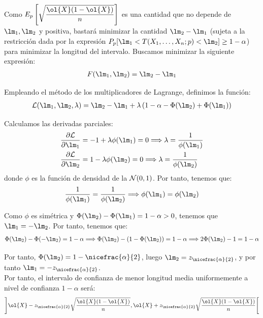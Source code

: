 \begin{ejercicio}[Reto]
    Como $E_p\left[\sqrt{\dfrac{\ol{X}(1-\ol{X})}{n}}\right]$ es una cantidad que no depende de $\lm_1,\lm_2$ y positiva, bastará minimizar la cantidad $\lm_2 - \lm_1$ (sujeta a la restricción dada por la expresión $P_p[\lm_1<T(X_1, \ldots, X_n;p)<\lm_2]\geq 1-\alpha$) para minimizar la longitud del intervalo. Buscamos minimizar la siguiente expresión:
    \begin{align*}
        F(\lm_1,\lm_2) = \lm_2 - \lm_1
    \end{align*}

    Empleando el método de los multiplicadores de Lagrange, definimos la función:
    \begin{align*}
        \cc{L}(\lm_1,\lm_2,\lambda) = \lm_2 - \lm_1 + \lambda\left(1-\alpha - \Phi(\lm_2) + \Phi(\lm_1)\right)
    \end{align*}

    Calculamos las derivadas parciales:
    \begin{align*}
        \frac{\partial \cc{L}}{\partial \lm_1} &= -1 + \lambda\phi(\lm_1) = 0 \Longrightarrow \lambda = \frac{1}{\phi(\lm_1)}\\
        \frac{\partial \cc{L}}{\partial \lm_2} &= 1 - \lambda\phi(\lm_2) = 0 \Longrightarrow \lambda = \frac{1}{\phi(\lm_2)}
    \end{align*}
    donde $\phi$ es la función de densidad de la $\mathcal{N}(0,1)$. Por tanto, tenemos que:
    \begin{align*}
        \frac{1}{\phi(\lm_1)} = \frac{1}{\phi(\lm_2)} \Longrightarrow \phi(\lm_1) = \phi(\lm_2)
    \end{align*}

    Como $\phi$ es simétrica y $\Phi(\lm_2) - \Phi(\lm_1) = 1 - \alpha>0$, tenemos que $\lm_1=-\lm_2$. Por tanto, tenemos que:
    \begin{align*}
        \Phi(\lm_2) - \Phi(-\lm_2) = 1 - \alpha \Longrightarrow \Phi(\lm_2) - (1 - \Phi(\lm_2)) = 1 - \alpha \Longrightarrow 2\Phi(\lm_2) - 1 = 1 - \alpha
    \end{align*}

    Por tanto, $\Phi(\lm_2) = 1 - \nicefrac{\alpha}{2}$, luego $\lm_2 = z_{\nicefrac{\alpha}{2}}$, y por tanto $\lm_1 = -z_{\nicefrac{\alpha}{2}}$.\\
    
    Por tanto, el intervalo de confianza de menor longitud media uniformemente a nivel de confianza $1-\alpha$ será:
    \begin{align*}
        \left]\ol{X} - z_{\nicefrac{\alpha}{2}}\sqrt{\dfrac{\ol{X}(1-\ol{X})}{n}},\ol{X} + z_{\nicefrac{\alpha}{2}}\sqrt{\dfrac{\ol{X}(1-\ol{X})}{n}}\right[
    \end{align*}
\end{ejercicio}
